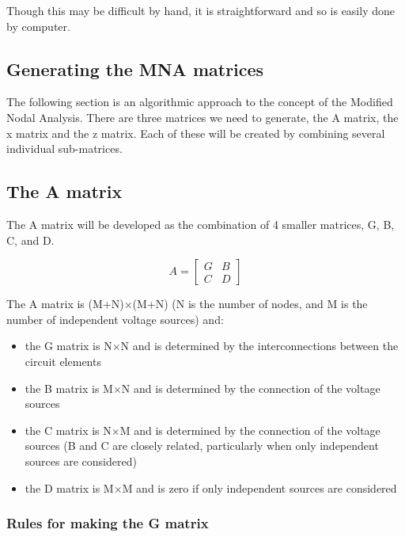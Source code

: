\documentclass[10pt]{report}
\begin{document}
Though this may be difficult by hand, it is straightforward and so is
easily done by computer.

\subsection{Generating the MNA matrices}

The following section is an algorithmic approach to the concept of the
Modified Nodal Analysis.  There are three matrices we need to
generate, the A matrix, the x matrix and the z matrix.  Each of these
will be created by combining several individual sub-matrices.

\subsection{The A matrix}

The A matrix will be developed as the combination of 4 smaller
matrices, G, B, C, and D.

\begin{equation}
A =
\begin{bmatrix}
G & B\\
C & D
\end{bmatrix}
\end{equation}

The A matrix is (M+N)$\times$(M+N) (N is the number of nodes, and M is the
number of independent voltage sources) and:

\begin{itemize}
\item
the G matrix is N$\times$N and is determined by the interconnections
between the circuit elements
\item
the B matrix is M$\times$N and is determined by the connection of the voltage
sources
\item
the C matrix is N$\times$M and is determined by the connection of
the voltage sources (B and C are closely related, particularly when
only independent sources are considered)
\item
the D matrix is M$\times$M and is zero if only independent sources are
considered
\end{itemize}

\subsubsection{Rules for making the G matrix}
\end{document}

